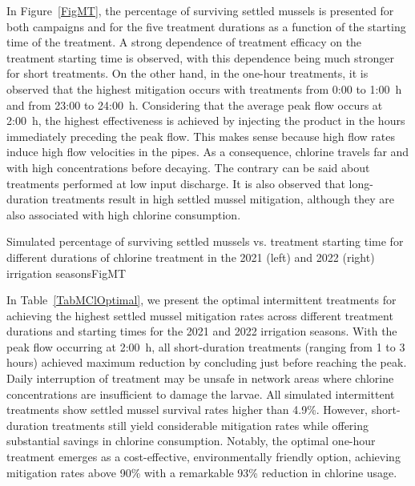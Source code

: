 \documentclass[review,authoryear]{elsarticle}
\begin{document}
In Figure~\ref{FigMT}, the percentage of surviving settled mussels is presented
for both campaigns and for the five treatment durations as a function of the
starting time of the treatment. A strong dependence of treatment efficacy on the
treatment starting time is observed, with this dependence being much stronger
for short treatments. On the other hand, in the one-hour treatments, it is
observed that the highest mitigation occurs with treatments from 0:00 to 1:00~h
and from 23:00 to 24:00~h. Considering that the average peak flow occurs at
2:00~h, the highest effectiveness is achieved by injecting the product in the
hours immediately preceding the peak flow. This makes sense because high flow
rates induce high flow velocities in the pipes. As a consequence, chlorine
travels far and with high concentrations before decaying. The contrary can be
said about treatments performed at low input discharge. It is also observed that
long-duration treatments result in high settled mussel mitigation, although
they are also associated with high chlorine consumption.

{Simulated percentage of surviving settled mussels vs. treatment starting time
for different durations of chlorine treatment in the 2021 (left) and 2022
(right) irrigation seasons}{FigMT}

In Table~\ref{TabMClOptimal}, we present the optimal intermittent treatments for
achieving the highest settled mussel mitigation rates across different
treatment durations and starting times for the 2021 and 2022 irrigation seasons.
With the peak flow occurring at 2:00~h, all short-duration treatments
(ranging from 1 to 3 hours) achieved maximum reduction by concluding just
before reaching the peak. Daily interruption of treatment may be unsafe in
network areas where chlorine concentrations are insufficient to damage the
larvae. All simulated intermittent treatments show settled mussel survival rates
higher than 4.9\%. However, short-duration treatments still yield considerable
mitigation rates while offering substantial savings in chlorine consumption.
Notably, the optimal one-hour treatment emerges as a cost-effective,
environmentally friendly option, achieving mitigation rates above 90\% with a
remarkable 93\% reduction in chlorine usage.
\end{document}
